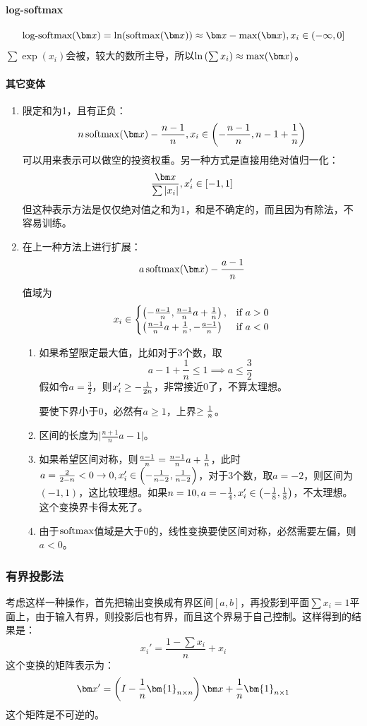 \paragraph*{log-softmax}
$$\text{log-softmax}(\bx)=\ln(\softmax(\bx))\approx \bx-\max(\bx),x_i\in(-\infty, 0]$$
$\sum \exp(x_i)$会被，较大的数所主导，所以$\ln\left(\sum x_i\right)\approx \max (\bx)$。
\paragraph*{其它变体}
\begin{enumerate}
	\item 限定和为1，且有正负：$$n\softmax(\bx)-\frac{n-1}{n},x_i\in\left(-\frac{n-1}{n},n-1+\inv{n}\right)$$可以用来表示可以做空的投资权重。另一种方式是直接用绝对值归一化：
$$\frac{\bx}{\sum |x_i|},x_i'\in[-1,1]$$
但这种表示方法是仅仅绝对值之和为1，和是不确定的，而且因为有除法，不容易训练。
\item 在上一种方法上进行扩展：
$$a\softmax(\bx)-\frac{a-1}{n}$$
值域为
$$	x_i\in\begin{cases}
\left(-\frac{a-1}{n},\frac{n-1}{n}a+\frac{1}{n}\right),&\text{if } a>0\\
	\left(\frac{n-1}{n}a+\frac{1}{n}, -\frac{a-1}{n}\right) &\text{if } a<0
\end{cases}$$
\begin{note}
	\begin{enumerate}
		\item 如果希望限定最大值，比如对于3个数，取
		$$a-1+\frac{1}{n}\leq 1\implies a\leq \frac{3}{2}$$
		假如令$a=\frac{3}{2}$，则$x_i'\geq -\frac{1}{2n}$，非常接近0了，不算太理想。
		
		要使下界小于0，必然有$a\geq 1$，上界$\geq \frac{1}{n}$。
		\item 区间的长度为$\lvert\frac{n+1}{n}a-1\rvert$。
		\item 如果希望区间对称，则$\frac{a-1}{n}=\frac{n-1}{n}a+\frac{1}{n}$，此时$a=\frac{2}{2-n}<0\rightarrow 0,x_i'\in\left(-\frac{1}{n-2},\frac{1}{n-2}\right)$，对于3个数，取$a=-2$，则区间为$(-1,1)$，这比较理想。如果$n=10,a=-\frac{1}{4},x_i'\in\left(-\frac{1}{8}, \frac{1}{8}\right)$，不太理想。这个变换界卡得太死了。
		\item 由于$\operatorname{softmax}$值域是大于0的，线性变换要使区间对称，必然需要左偏，则$a<0$。
	\end{enumerate}

\end{note}
\end{enumerate}
\subsubsection{有界投影法}
考虑这样一种操作，首先把输出变换成有界区间$[a,b]$，再投影到平面$\sum x_i=1$平面上，由于输入有界，则投影后也有界，而且这个界易于自己控制。这样得到的结果是：
\begin{equation}\label{constrained-projection-normalize}
x_i'=\frac{1-\sum x_i}{n}+x_i
\end{equation}
这个变换的矩阵表示为：
$$\bx'=\left(I-\inv{n}\bm{1}_{n\times n}\right)\bx+\inv{n}\bm{1}_{n\times 1}$$
这个矩阵是不可逆的。

